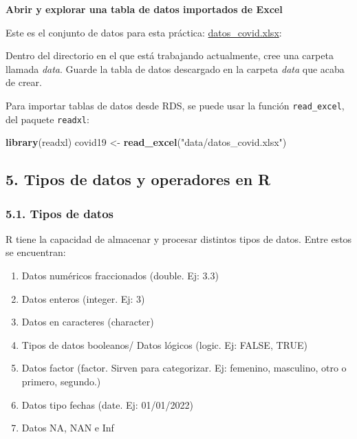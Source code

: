\documentclass[
]{article}
\newenvironment{Shaded}{\begin{snugshade}}{\end{snugshade}}
\newcommand{\FunctionTok}[1]{\textcolor[rgb]{0.13,0.29,0.53}{\textbf{#1}}}
\newcommand{\NormalTok}[1]{#1}
\newcommand{\OtherTok}[1]{\textcolor[rgb]{0.56,0.35,0.01}{#1}}
\newcommand{\StringTok}[1]{\textcolor[rgb]{0.31,0.60,0.02}{#1}}
\begin{document}
\textbf{Abrir y explorar una tabla de datos importados de Excel}

Este es el conjunto de datos para esta práctica:
\href{https://raw.githubusercontent.com/TRACE-LAC/TRACE-LAC-data/main/datos_covid.xlsx}{datos\_covid.xlsx}:

Dentro del directorio en el que está trabajando actualmente, cree una
carpeta llamada \emph{data}. Guarde la tabla de datos descargado en la
carpeta \emph{data} que acaba de crear.

Para importar tablas de datos desde RDS, se puede usar la función
\texttt{read\_excel}, del paquete \texttt{readxl}:

\begin{Shaded}
\begin{Highlighting}[]
\FunctionTok{library}\NormalTok{(readxl)}
\NormalTok{covid19 }\OtherTok{\textless{}{-}} \FunctionTok{read\_excel}\NormalTok{(}\StringTok{"data/datos\_covid.xlsx"}\NormalTok{)}
\end{Highlighting}
\end{Shaded}

\subsection{5. Tipos de datos y operadores en
R}\label{tipos-de-datos-y-operadores-en-r}

\subsubsection{5.1. Tipos de datos}\label{tipos-de-datos}

R tiene la capacidad de almacenar y procesar distintos tipos de datos.
Entre estos se encuentran:

\begin{enumerate}
\def\labelenumi{\arabic{enumi}.}
\item
  Datos numéricos fraccionados (double. Ej: 3.3)
\item
  Datos enteros (integer. Ej: 3)
\item
  Datos en caracteres (character)
\item
  Tipos de datos booleanos/ Datos lógicos (logic. Ej: FALSE, TRUE)
\item
  Datos factor (factor. Sirven para categorizar. Ej: femenino,
  masculino, otro o primero, segundo.)
\item
  Datos tipo fechas (date. Ej: 01/01/2022)
\item
  Datos NA, NAN e Inf
\end{enumerate}
\end{document}
